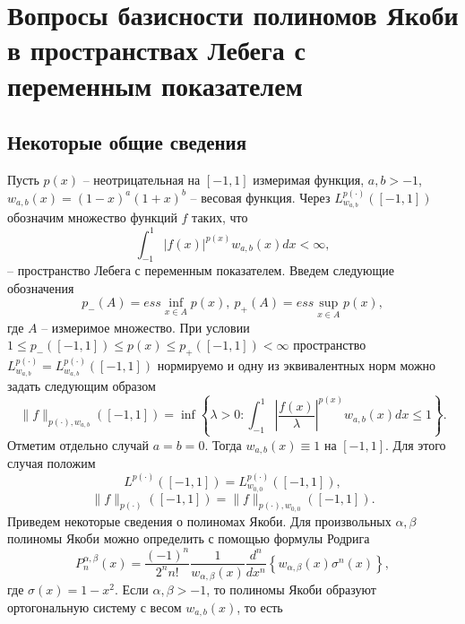 \chapter{Вопросы базисности полиномов Якоби в пространствах Лебега с переменным показателем}

\section{Некоторые общие сведения}\label{Intro-Tadg}
Пусть $p(x)$ -- неотрицательная на $[-1,1]$ измеримая функция, $a,b>-1$, $w_{a,b}(x)=(1-x)^a(1+x)^b$ -- весовая функция. Через $L^{p(\cdot)}_{w_{a,b}}([-1,1])$ обозначим множество функций $f$ таких, что
\begin{equation}\label{s2-lpx-def-1}
  \int_{-1}^1|f(x)|^{p(x)}w_{a,b}(x)dx<\infty,
\end{equation}
-- пространство Лебега с переменным показателем. Введем следующие обозначения
$$p_-(A)=ess\inf_{x\in A}p(x),\ p_+(A)=ess\sup_{x\in A}p(x),$$
где $A$ -- измеримое множество.
 При условии $1\le p_-([-1,1])\le p(x)\le p_+([-1,1])<\infty$ пространство $L^{p(\cdot)}_{w_{a,b}}=L^{p(\cdot)}_{w_{a,b}}([-1,1])$ нормируемо \cite{tad-lpxtopology} и одну из эквивалентных норм можно задать следующим образом
\begin{equation}\label{s2-lpx-norm}
  \|f\|_{p(\cdot),w_{a,b}}([-1,1])=\inf\left\{\lambda>0:\int_{-1}^1\left|\frac{f(x)}\lambda\right|^{p(x)}w_{a,b}(x)dx\le1\right\}.
\end{equation}
Отметим отдельно случай $a=b=0$. Тогда $w_{a,b}(x)\equiv1$ на $[-1,1]$. Для этого случая положим $$L^{p(\cdot)}([-1,1])=L^{p(\cdot)}_{w_{0,0}}([-1,1]),$$
$$\|f\|_{p(\cdot)}([-1,1])=\|f\|_{p(\cdot),w_{0,0}}([-1,1]).$$
Приведем некоторые сведения о полиномах Якоби. Для произвольных $\alpha,\beta$ полиномы Якоби можно определить с помощью формулы Родрига
\begin{equation}\label{RodrigueFormula}
  P_n^{\alpha,\beta}(x) = \frac{(-1)^n}{2^nn!}\frac1{w_{\alpha,\beta}(x)}\frac{d^n}{dx^n} \left\{w_{\alpha,\beta}(x)\sigma^n(x)\right\},
\end{equation}
где $\sigma(x)=1-x^2$. Если $\alpha,\beta>-1$, то полиномы Якоби образуют ортогональную систему с весом  $w_{a,b}(x)$, то есть

